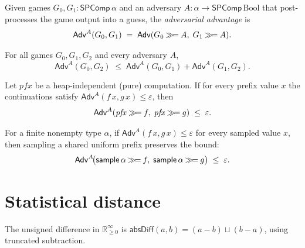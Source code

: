 \begin{definition}
  \label{def:advantageA}
  \leanok
  Given games $G_0, G_1 : \mathsf{SPComp}\,\alpha$ and an adversary
  $A : \alpha \to \mathsf{SPComp}\,\mathrm{Bool}$ that post-processes the game output
  into a guess, the \emph{adversarial advantage} is
  \[
    \mathsf{Adv}^A(G_0, G_1) \;=\; \mathsf{Adv}(G_0 \mathbin{\gg\!=} A,\; G_1 \mathbin{\gg\!=} A).
  \]
\end{definition}

\begin{theorem}
  \label{thm:advantageA-triangle}
  \leanok
  For all games $G_0, G_1, G_2$ and every adversary $A$,
  \[
    \mathsf{Adv}^A(G_0, G_2)
      \;\le\; \mathsf{Adv}^A(G_0, G_1) + \mathsf{Adv}^A(G_1, G_2).
  \]
\end{theorem}

\begin{theorem}
  \label{thm:advantageA-isPure-bind}
  \leanok
  Let $\mathit{pfx}$ be a heap-independent (pure) computation. If for every prefix
  value $x$ the continuations satisfy $\mathsf{Adv}^A(f\,x, g\,x) \le \varepsilon$,
  then
  \[
    \mathsf{Adv}^A(\mathit{pfx} \mathbin{\gg\!=} f,\; \mathit{pfx} \mathbin{\gg\!=} g)
      \;\le\; \varepsilon.
  \]
\end{theorem}

\begin{theorem}
  \label{thm:advantageA-sample-bind}
  \leanok
  For a finite nonempty type $\alpha$, if
  $\mathsf{Adv}^A(f\,x, g\,x) \le \varepsilon$ for every sampled value $x$, then
  sampling a shared uniform prefix preserves the bound:
  \[
    \mathsf{Adv}^A\!\bigl(\mathsf{sample}\,\alpha \mathbin{\gg\!=} f,\;
      \mathsf{sample}\,\alpha \mathbin{\gg\!=} g\bigr) \;\le\; \varepsilon.
  \]
\end{theorem}

\section{Statistical distance}

\begin{definition}
  \label{def:absdiff}
  \leanok
  The unsigned difference in $\mathbb{R}_{\ge 0}^{\infty}$ is
  $\mathsf{absDiff}(a, b) = (a - b) \sqcup (b - a)$, using truncated subtraction.
\end{definition}

